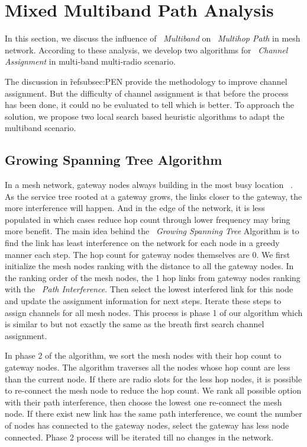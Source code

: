 \section{Mixed Multiband Path Analysis}
\label{sec:wmalgorithms}


In this section, we discuss the influence of ~\emph{Multiband} on ~\emph{Multihop Path} in mesh network. 
According to these analysis, we develop two algorithms for ~\emph{Channel Assignment} in multi-band multi-radio scenario.




The discussion in \~ref{subsec:PEN} provide the methodology to improve channel assignment. But the difficulty of channel assignment is that before the process has been done, it could no be evaluated to tell which is better.
To approach the solution, we propose two local search based heuristic algorithms to adapt the multiband scenario. 


\subsection{Growing Spanning Tree Algorithm}
In a mesh network, gateway nodes always building in the most busy location ~\cite{robinson2008adding, he2008optimizing}.
As the service tree rooted at a gateway grows, the links closer to the gateway, the more interference will happen.
And in the edge of the network, it is less populated in which cases reduce hop count through lower frequency may bring more benefit. 
The main idea behind the ~\emph{Growing Spanning Tree} Algorithm is 
to find the link has least interference on the network for each node in a greedy manner each step. The hop count for gateway nodes themselves are 0.
We first initialize the mesh nodes ranking with the distance to all the gateway nodes. In the ranking order of the mesh nodes, the 1 hop links from gateway nodes ranking with the ~\emph{Path Interference}. Then select the lowest interfered link for this node and update the assignment information for next steps. 
Iterate these steps to assign channels for all mesh nodes. This process is phase 1 of our algorithm which is similar to but not exactly the same as the breath first search channel assignment. 

In phase 2 of the algorithm, we sort the mesh nodes with their hop count to gateway nodes. 
The algorithm traverses all the nodes whose hop count are less than the current node. If there are radio slots for the less hop nodes, it is possible to re-connect the mesh node to reduce the hop count. We rank all possible option with their path interference, then choose the lowest one re-connect the mesh node. If there exist new link has the same path interference, we count the number of nodes has connected to the gateway nodes, select the gateway has less node connected. Phase 2 process will be iterated till no changes in the network.


